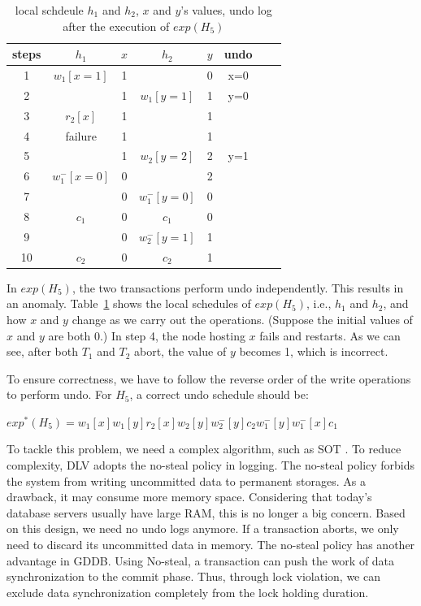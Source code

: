 \documentclass[conference]{IEEEtran}
\begin{document}
\begin{table}[tbp]
  \centering
  \caption{local schdeule $h_1$ and $h_2$, $x$ and $y$'s values, undo log after the execution of ${exp(H_5)}$}
  \begin{tabular}{|c|c|c|c|c|c|c|c|}
  \hline
steps & $h_1$ & $x$ & $h_2$ & $y$ & undo   \\
  \hline
  \hline
 1& $w_1[x=1]$ & 1 & &  0 & x=0  \\
  \hline
  2& & 1 & $w_1[y=1]$ & 1 & y=0   \\
  \hline
3 & $r_2[x]$ & 1 & & 1 &    \\

  \hline
 4 & failure  & 1 & & 1 &  \\
  \hline
 5& & 1 &   $w_2[y=2]$ & 2 & y=1  \\
  \hline
6  & $w^-_1[x=0]$ & 0 && 2 &   \\
  \hline
7 & & 0 & $w^-_1[y=0]$ & 0 &   \\
  \hline


8  & $c_1$ & 0 &$c_1$& 0 &   \\
  \hline
9 & & 0 &  $w^-_2[y=1]$& 1 &   \\
  \hline
10 & $c_2$ & 0 &$c_2$& 1 &  \\
  \hline
  \end{tabular}

\label{tbl:x_y_vlues}
\end{table}

In $exp(H_5)$, the two transactions perform undo independently. This results in an anomaly.
Table~\ref{tbl:x_y_vlues} shows the local schedules of $exp(H_5)$, i.e., ${h_1}$ and  ${h_2}$, and how ${x}$ and ${y}$ change as we carry out the operations.
(Suppose the initial values of ${x}$ and ${y}$ are both 0.)
In step 4, the node hosting ${x}$ fails and restarts.
As we can see, after both ${T_1}$ and ${T_2}$ abort, the value of ${y}$ becomes 1, which is incorrect.

To ensure correctness, we have to follow the reverse order of the write operations to perform undo.
For ${H_5}$, a correct undo schedule should be:
\begin{center}
${exp^*(H_5) = w_1[x]w_1[y]r_2[x]w_2[y]w^-_2[y]c_2w^-_1[y]w^-_1[x]c_1}$
\end{center}

To tackle this problem, we need a complex algorithm, such as SOT \cite{UnifyCR:journals/is/AlonsoVABASW94}.
To reduce complexity, DLV adopts the no-steal policy in logging.
The no-steal policy forbids the system from writing uncommitted data to permanent storages.
As a drawback, it may consume more memory space.
Considering that today's database servers usually have large RAM, this is no longer a big concern.
Based on this design, we need no undo logs anymore. If a transaction aborts, we only need to discard its uncommitted data in memory.
The no-steal policy has another advantage in GDDB.
Using No-steal, a transaction can push the work of data synchronization to the commit phase.
Thus, through lock violation, we can exclude data synchronization completely from the lock holding duration.
\end{document}

